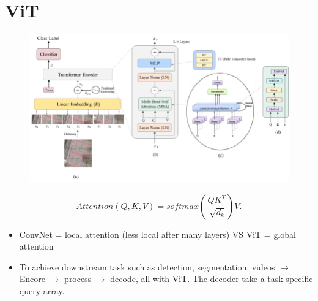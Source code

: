 \documentclass{article}
\theoremstyle{plain}%
\theoremstyle{definition}
\theoremstyle{remark}
\begin{document}
\section{ViT}
\begin{figure}[H]
    \centering
    \includegraphics*[width=.8\textwidth]{figs/The-Vision-Transformer-architecture-a-the-main-architecture-of-the-model-b-the.png}
\end{figure}
\[
    Attention(Q,K,V) = softmax(\frac{Q K^T }{\sqrt[]{d_k }}) V
.\]

\begin{itemize}
    \item ConvNet = local attention (less local after many layers) VS ViT = global attention 
    \item To achieve downstream task such as detection, segmentation, videos $\rightarrow$ Encore $\rightarrow$ process $\rightarrow$ decode, all with ViT. The decoder take a task specific query array. 
\end{itemize}
\end{document}
